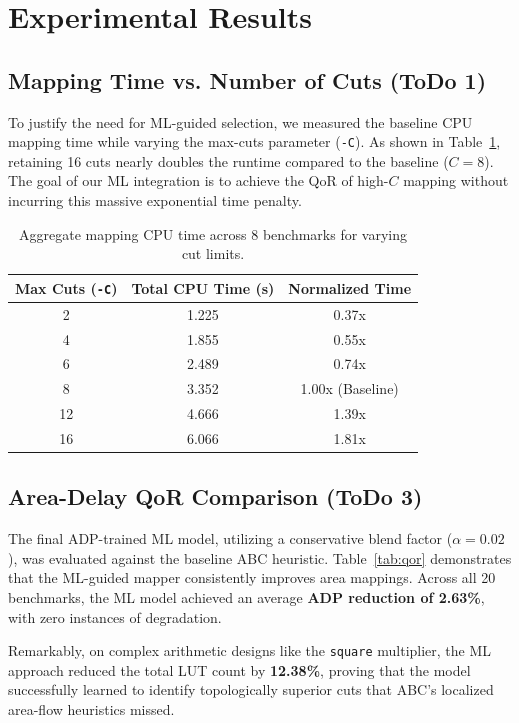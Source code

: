 \documentclass[11pt,a4paper]{article}
\begin{document}
\section{Experimental Results}

\subsection{Mapping Time vs. Number of Cuts (ToDo 1)}
To justify the need for ML-guided selection, we measured the baseline CPU mapping time while varying the max-cuts parameter (\texttt{-C}). As shown in Table~\ref{tab:mapping_time}, retaining 16 cuts nearly doubles the runtime compared to the baseline ($C=8$). The goal of our ML integration is to achieve the QoR of high-$C$ mapping without incurring this massive exponential time penalty.

\begin{table}[h!]
\centering
\begin{tabular}{ccc}
\toprule
\textbf{Max Cuts (\texttt{-C})} & \textbf{Total CPU Time (s)} & \textbf{Normalized Time} \\
\midrule
2  & 1.225 & 0.37x \\
4  & 1.855 & 0.55x \\
6  & 2.489 & 0.74x \\
8  & 3.352 & 1.00x (Baseline) \\
12 & 4.666 & 1.39x \\
16 & 6.066 & 1.81x \\
\bottomrule
\end{tabular}
\caption{Aggregate mapping CPU time across 8 benchmarks for varying cut limits.}
\label{tab:mapping_time}
\end{table}

\subsection{Area-Delay QoR Comparison (ToDo 3)}
The final ADP-trained ML model, utilizing a conservative blend factor ($\alpha = 0.02$), was evaluated against the baseline ABC heuristic. Table~\ref{tab:qor} demonstrates that the ML-guided mapper consistently improves area mappings. Across all 20 benchmarks, the ML model achieved an average \textbf{ADP reduction of 2.63\%}, with zero instances of degradation. 

Remarkably, on complex arithmetic designs like the \texttt{square} multiplier, the ML approach reduced the total LUT count by \textbf{12.38\%}, proving that the model successfully learned to identify topologically superior cuts that ABC's localized area-flow heuristics missed.
\end{document}
